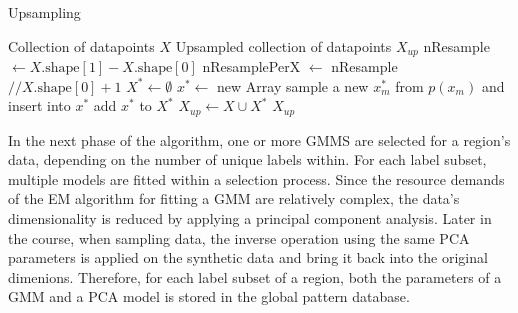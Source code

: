  \begin{algorithm}
    \caption{Upsampling}
    \label{alg:upsampling}
 
    \begin{algorithmic}[1]
        \REQUIRE Collection of datapoints $X$
        \ENSURE Upsampled collection of datapoints $X_{up}$
        \STATE nResample $\leftarrow X.\text{shape}[1] - X.\text{shape}[0]$ 
        \STATE nResamplePerX $\leftarrow$ nResample $// X.\text{shape}[0] + 1$
        \STATE $X^* \leftarrow \emptyset$
            \STATE $x^* \leftarrow$ new Array
                \STATE sample a new $x_m^*$ from $p(x_m)$ and insert into $x^*$
            \ENDFOR
            \STATE add $x^*$ to $X^*$
        \ENDFOR
        \STATE $X_{up} \leftarrow X \cup X^*$
        \RETURN $X_{up}$

    \end{algorithmic}
 \end{algorithm}

 In the next phase of the algorithm, one or more GMMS are selected for a region's data, depending on the number of unique labels within. For each label subset, multiple models are fitted within a selection process. Since the resource demands of the EM algorithm for fitting a GMM are relatively complex, the data's dimensionality is reduced by applying a principal component analysis. Later in the course, when sampling data, the inverse operation using the same PCA parameters is applied on the synthetic data and bring it back into the original dimenions. Therefore, for each label subset of a region, both the parameters of a GMM and a PCA model is stored in the global pattern database.

